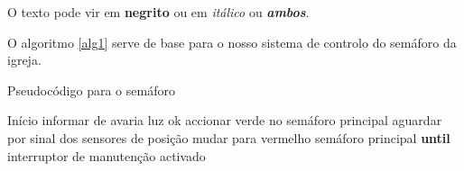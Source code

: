O texto pode vir em \textbf{negrito} ou em \textit{itálico} ou \textbf{\textit{ambos}}.

O algoritmo \ref{alg1} serve de base para o nosso sistema de controlo do semáforo da igreja.
\begin{algorithm}
\caption{Pseudocódigo para o semáforo}
\label{alg1}
\begin{algorithmic}[1]
\STATE Início
\STATE informar de avaria
\ELSE
\STATE luz ok\ENDIF \ENDFOR
\LOOP
\STATE accionar verde no semáforo principal
\STATE aguardar por sinal dos sensores de posição
\STATE mudar para vermelho semáforo principal
\ENDIF
\ENDLOOP
\STATE \textbf{until} interruptor de manutenção activado
\end{algorithmic}
\end{algorithm}





